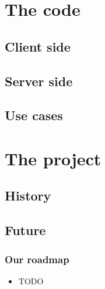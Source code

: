 \documentclass{beamer}
\begin{document}
\section{The code}

\subsection{Client side}


\subsection{Server side}


\subsection{Use cases}


\section{The project}

\subsection{History}

\subsection{Future}
%
\begin{frame}
\frametitle{Our roadmap}
%
\begin{itemize}
%
\item TODO
%
\end{itemize}
\end{frame}
\end{document}
